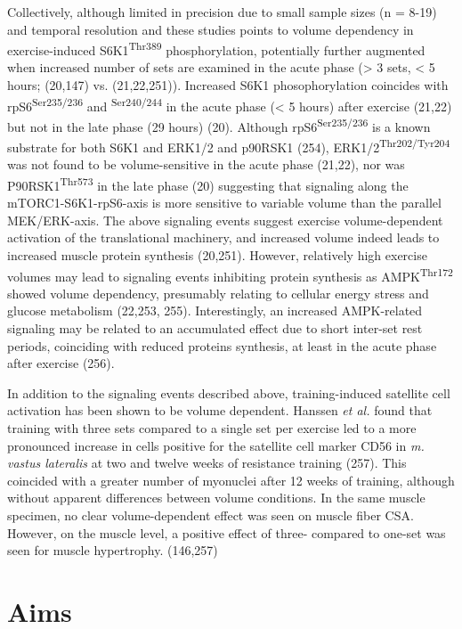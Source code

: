 \documentclass[twoside,10pt]{gihclass} %
\begin{document}
Collectively, although limited in precision due to small sample sizes (n = 8-19) and temporal resolution and
these studies points to volume dependency in exercise-induced S6K1\textsuperscript{Thr389} phosphorylation, potentially further augmented when increased number of sets are examined in the acute phase
(\textgreater{} 3 sets, \textless{} 5 hours; (20,147) vs. (21,22,251)).
Increased S6K1 phosophorylation coincides with rpS6\textsuperscript{Ser235/236} and \textsuperscript{Ser240/244} in the acute phase (\textless{} 5 hours) after exercise
(21,22) but not in the late phase (29 hours) (20).
Although rpS6\textsuperscript{Ser235/236} is a known substrate for both S6K1 and ERK1/2 and p90RSK1
(254),
ERK1/2\textsuperscript{Thr202/Tyr204} was not found to be volume-sensitive in the acute phase
(21,22),
nor was P90RSK1\textsuperscript{Thr573} in the late phase (20)
suggesting that signaling along the mTORC1-S6K1-rpS6-axis is more sensitive to variable volume than the parallel MEK/ERK-axis.
The above signaling events suggest exercise volume-dependent activation of the translational machinery, and increased volume indeed leads to increased muscle protein synthesis
(20,251).
However, relatively high exercise volumes may lead to signaling events inhibiting protein synthesis as AMPK\textsuperscript{Thr172} showed volume dependency, presumably relating to cellular energy stress and glucose metabolism
(22,253, 255).
Interestingly, an increased AMPK-related signaling may be related to an accumulated effect due to short inter-set rest periods, coinciding with reduced proteins synthesis, at least in the acute phase after exercise
(256).

In addition to the signaling events described above, training-induced satellite cell activation has been shown to be volume dependent.
Hanssen \emph{et al.} found that training with three sets compared to a single set per exercise led to a more pronounced increase in cells positive for the satellite cell marker CD56 in \emph{m. vastus lateralis} at two and twelve weeks of resistance training (257).
This coincided with a greater number of myonuclei after 12 weeks of training, although without apparent differences between volume conditions.
In the same muscle specimen, no clear volume-dependent effect was seen on muscle fiber CSA. However, on the muscle level, a positive effect of three- compared to one-set was seen for muscle hypertrophy.
(146,257)

\hypertarget{aims}{%
\chapter{Aims}\label{aims}}
\end{document}
